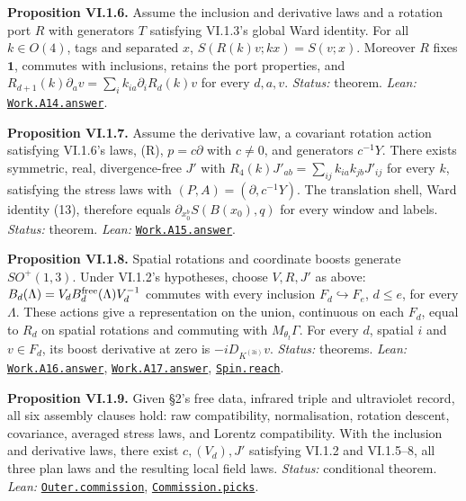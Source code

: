 \documentclass[
  letterpaper,
  11pt]{article}
\begin{document}
\textbf{Proposition VI.1.6.} Assume the inclusion and derivative laws
and a rotation port \(R\) with generators \(T\) satisfying VI.1.3's
global Ward identity. For all \(k\in O(4)\), tags and separated \(x\),
\(S(R(k)v;kx)=S(v;x)\). Moreover \(R\) fixes \(\mathbf1\), commutes with
inclusions, retains the port properties, and
\(R_{d+1}(k)\partial_av=\sum_i k_{ia}\partial_iR_d(k)v\) for every
\(d,a,v\). \emph{Status:} theorem. \emph{Lean:}
\href{https://github.com/yang-mills-group/OpenAI-YM-20261028/blob/3456e5e75cf8d4cd558955a5c7638fba2d68f464/YM/Work/A14.lean\#L417-L420}{\texttt{Work.A14.answer}}.

\textbf{Proposition VI.1.7.} Assume the derivative law, a covariant
rotation action satisfying VI.1.6's laws, (R), \(p=c\partial\) with
\(c\ne0\), and generators \(c^{-1}Y\). There exists symmetric, real,
divergence-free \(J'\) with
\(R_4(k)J'_{ab}=\sum_{ij}k_{ia}k_{jb}J'_{ij}\) for every \(k\),
satisfying the stress laws with \((P,A)=(\partial,c^{-1}Y)\). The
translation shell, Ward identity (13), therefore equals
\(\partial_{x_0^b}S(B(x_0),q)\) for every window and labels.
\emph{Status:} theorem. \emph{Lean:}
\href{https://github.com/yang-mills-group/OpenAI-YM-20261028/blob/3456e5e75cf8d4cd558955a5c7638fba2d68f464/YM/Work/A15.lean\#L187-L192}{\texttt{Work.A15.answer}}.

\textbf{Proposition VI.1.8.} Spatial rotations and coordinate boosts
generate \(SO^+(1,3)\). Under VI.1.2's hypotheses, choose \(V,R,J'\) as
above: \(B_d(\Lambda)=V_dB_d^{\rm free}(\Lambda)V_d^{-1}\) commutes with
every inclusion \(F_d\hookrightarrow F_e\), \(d\le e\), for every
\(\Lambda\). These actions give a representation on the union,
continuous on each \(F_d\), equal to \(R_d\) on spatial rotations and
commuting with \(M_{\theta_t}\Gamma\). For every \(d\), spatial \(i\)
and \(v\in F_d\), its boost derivative at zero is \(-iD_{K^{(3i)}}v\).
\emph{Status:} theorems. \emph{Lean:}
\href{https://github.com/yang-mills-group/OpenAI-YM-20261028/blob/3456e5e75cf8d4cd558955a5c7638fba2d68f464/YM/Work/A16.lean\#L91-L101}{\texttt{Work.A16.answer}},
\href{https://github.com/yang-mills-group/OpenAI-YM-20261028/blob/3456e5e75cf8d4cd558955a5c7638fba2d68f464/YM/Work/A17.lean\#L88-L101}{\texttt{Work.A17.answer}},
\href{https://github.com/yang-mills-group/OpenAI-YM-20261028/blob/3456e5e75cf8d4cd558955a5c7638fba2d68f464/YM/Spin/Floor.lean\#L39-L74}{\texttt{Spin.reach}}.

\textbf{Proposition VI.1.9.} Given §2's free data, infrared triple and
ultraviolet record, all six assembly clauses hold: raw compatibility,
normalisation, rotation descent, covariance, averaged stress laws, and
Lorentz compatibility. With the inclusion and derivative laws, there
exist \(c,(V_d),J'\) satisfying VI.1.2 and VI.1.5--8, all three plan
laws and the resulting local field laws. \emph{Status:} conditional
theorem. \emph{Lean:}
\href{https://github.com/yang-mills-group/OpenAI-YM-20261028/blob/3456e5e75cf8d4cd558955a5c7638fba2d68f464/YM/Next/ROTATIONS.lean\#L126-L131}{\texttt{Outer.commission}},
\href{https://github.com/yang-mills-group/OpenAI-YM-20261028/blob/3456e5e75cf8d4cd558955a5c7638fba2d68f464/YM/Org/Twist.lean\#L45-L53}{\texttt{Commission.picks}}.
\end{document}
